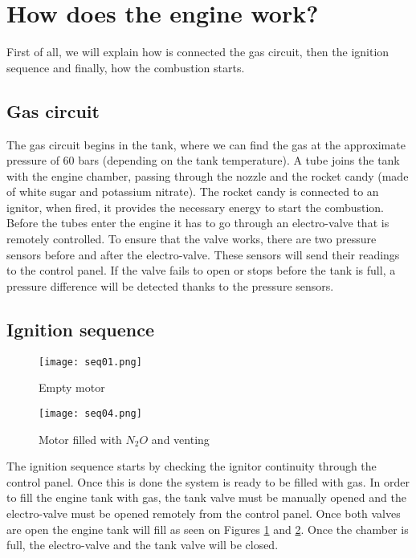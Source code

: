 
\section*{How does the engine work?}

First of all, we will explain how is connected the gas circuit, then the ignition sequence and finally, how the combustion starts.

\subsection*{Gas circuit}

The gas circuit begins in the tank, where we can find the gas at the approximate pressure of 60 bars (depending on the tank temperature). A tube joins the tank with the engine chamber, passing through the nozzle and the rocket candy (made of white sugar and potassium nitrate). The rocket candy is connected to an ignitor, when fired, it provides the necessary energy to start the combustion. Before the tubes enter the engine it has to go through an electro-valve that is remotely controlled. To ensure that the valve works, there are two pressure sensors before and after the electro-valve. These sensors will send their readings to the control panel. If the valve fails to open or stops before the tank is full, a pressure difference will be detected thanks to the pressure sensors.

\subsection*{Ignition sequence}

\begin{figure}[h]
  \centering
  \texttt{[image: seq01.png]}
  \caption{Empty motor}
  \label{fig:emptyMotor}
\end{figure}

\begin{figure}[h]
  \centering
  \texttt{[image: seq04.png]}
  \caption{Motor filled with $N_2O$ and venting}
  \label{fig:filledMotor}
\end{figure}

The ignition sequence starts by checking the ignitor continuity through the control panel. Once this is done the system is ready to be filled with gas. In order to fill the engine tank with gas, the tank valve must be manually opened and the electro-valve must be opened remotely from the control panel. Once both valves are open the engine tank will fill as seen on Figures \ref{fig:emptyMotor} and \ref{fig:filledMotor}. Once the chamber is full, the electro-valve and the tank valve will be closed.

